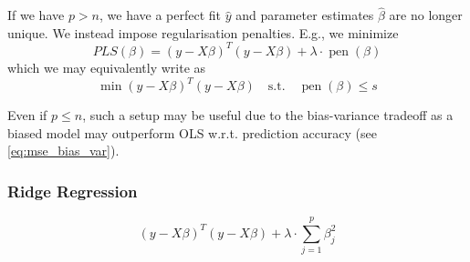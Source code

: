 \documentclass[11pt, %
	oneside, %
	english, %
	onehalfspacing, %
	]{article} %
\numberwithin{equation}{section}
\begin{document}
If we have $p > n$, we have a perfect fit $\hat{y}$ and parameter estimates $\hat{\beta}$ are no longer unique. We instead impose regularisation penalties. E.g., we minimize
\begin{equation*}
    P L S(\beta)=(y-X \beta)^T(y-X \beta)+\lambda \cdot \operatorname{pen}(\beta)
\end{equation*}
which we may equivalently write as
\begin{equation*}
        \min  (y - X \beta)^T (y-X \beta) \quad
        \text{s.t.} \quad \operatorname{pen}(\beta) \leq s
\end{equation*}

Even if $p \leq n$, such a setup may be useful due to the bias-variance tradeoff as a biased model may outperform OLS w.r.t. prediction accuracy (see \eqref{eq:mse_bias_var}).

\subsubsection*{Ridge Regression}

\begin{equation*}
    (y-X \beta)^T(y-X \beta)+\lambda \cdot \sum_{j=1}^p \beta_j^2
\end{equation*}
\end{document}
